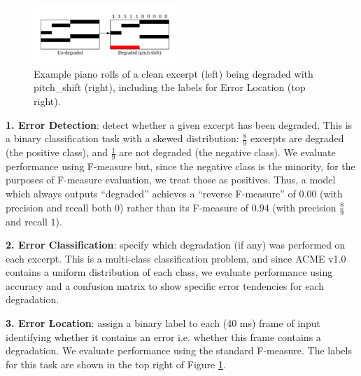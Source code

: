 \documentclass{article}
\begin{document}
\begin{figure}
    \centering
    \includegraphics[width=0.48\textwidth,trim={0.3cm 3cm 0.3cm 3.2cm},clip]{figs/example.png}
    \caption{Example piano rolls of a clean excerpt (left) being degraded with pitch\_shift (right), including the labels for Error Location (top right).}
    \label{fig:example}
\end{figure}

\textbf{1. Error Detection}: detect whether a given excerpt has been degraded. This is a binary classification task with a skewed distribution: $\frac{8}{9}$ excerpts are degraded (the positive class), and $\frac{1}{9}$ are not degraded (the negative class). We evaluate performance using F-measure but, since the negative class is the minority, for the purposes of F-measure evaluation, we treat those as positives. Thus, a model which always outputs ``degraded'' achieves a ``reverse F-measure'' of $0.00$ (with precision and recall both 0) rather than its F-measure of $0.94$ (with precision $\frac{8}{9}$ and recall $1$).

\textbf{2. Error Classification}: specify which degradation (if any) was performed on each excerpt. This is a multi-class classification problem, and since ACME v1.0 contains a uniform distribution of each class, we evaluate performance using accuracy and a confusion matrix to show specific error tendencies for each degradation.

\textbf{3. Error Location}: assign a binary label to each (40 ms) frame of input identifying whether it contains an error i.e. whether this frame contains a degradation. We evaluate performance using the standard F-measure. The labels for this task are shown in the top right of Figure \ref{fig:example}.
\end{document}
